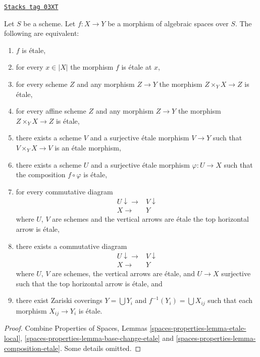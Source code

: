 \begin{lemma}
\label{spaces-morphisms-lemma-etale-local}
\href{https://stacks.math.columbia.edu/tag/03XT}{\texttt{Stacks tag 03XT}}

Let $S$ be a scheme.
Let $f : X \to Y$ be a morphism of algebraic spaces over $S$.
The following are equivalent:
\begin{enumerate}
\item $f$ is \'etale,
\item for every $x \in |X|$ the morphism $f$ is \'etale at $x$,
\item for every scheme $Z$ and any morphism $Z \to Y$ the morphism
$Z \times_Y X \to Z$ is \'etale,
\item for every affine scheme $Z$ and any morphism
$Z \to Y$ the morphism $Z \times_Y X \to Z$ is \'etale,
\item there exists a scheme $V$ and a surjective \'etale morphism
$V \to Y$ such that $V \times_Y X \to V$ is an \'etale morphism,
\item there exists a scheme $U$ and a surjective \'etale morphism
$\varphi : U \to X$ such that the composition $f \circ \varphi$
is \'etale,
\item for every commutative diagram
$$
\begin{array}{cc}U \downarrow\longrightarrow & V \downarrow \\ X \longrightarrow & Y\end{array}
$$
where $U$, $V$ are schemes and the vertical arrows are \'etale
the top horizontal arrow is \'etale,
\item there exists a commutative diagram
$$
\begin{array}{cc}U \downarrow\longrightarrow & V \downarrow \\ X \longrightarrow & Y\end{array}
$$
where $U$, $V$ are schemes, the vertical arrows are \'etale, and
$U \to X$ surjective such that the top horizontal arrow is \'etale, and
\item there exist Zariski coverings $Y = \bigcup Y_i$ and
$f^{-1}(Y_i) = \bigcup X_{ij}$ such that each morphism
$X_{ij} \to Y_i$ is \'etale.
\end{enumerate}
\end{lemma}

\begin{proof}
Combine
Properties of Spaces, Lemmas
\ref{spaces-properties-lemma-etale-local},
\ref{spaces-properties-lemma-base-change-etale} and
\ref{spaces-properties-lemma-composition-etale}.
Some details omitted.
\end{proof}

